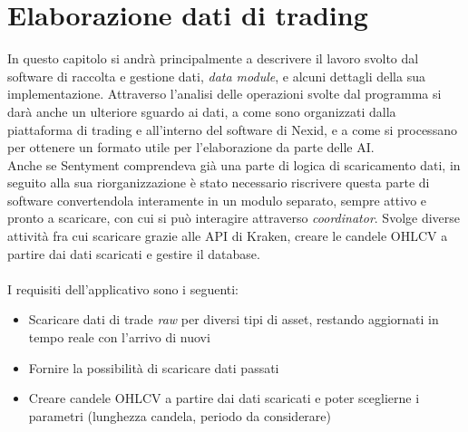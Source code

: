 \documentclass[a4paper,12pt]{report}
\begin{document}
\chapter{Elaborazione dati di trading}
\label{cap3}
In questo capitolo si andrà principalmente a descrivere il lavoro svolto dal software di raccolta e gestione dati, \textit{data module}, e alcuni dettagli della sua implementazione. Attraverso l'analisi delle operazioni svolte dal programma si darà anche un ulteriore sguardo ai dati, a come sono organizzati dalla piattaforma di trading e all'interno del software di Nexid, e a come si processano per ottenere un formato utile per l'elaborazione da parte delle AI.\\
Anche se Sentyment comprendeva già una parte di logica di scaricamento dati, in seguito alla sua riorganizzazione è stato necessario riscrivere questa parte di software convertendola interamente in un modulo separato, sempre attivo e pronto a scaricare, con cui si può interagire attraverso \textit{coordinator}. Svolge diverse attività fra cui scaricare grazie alle API di Kraken, creare le candele OHLCV a partire dai dati scaricati e gestire il database.\\~\\
I requisiti dell'applicativo sono i seguenti:
\begin{itemize}
	\item Scaricare dati di trade \textit{raw} per diversi tipi di asset, restando aggiornati in tempo reale con l'arrivo di nuovi
	\item Fornire la possibilità di scaricare dati passati
	\item Creare candele OHLCV a partire dai dati scaricati e poter sceglierne i parametri (lunghezza candela, periodo da considerare)
\end{itemize}
\end{document}
